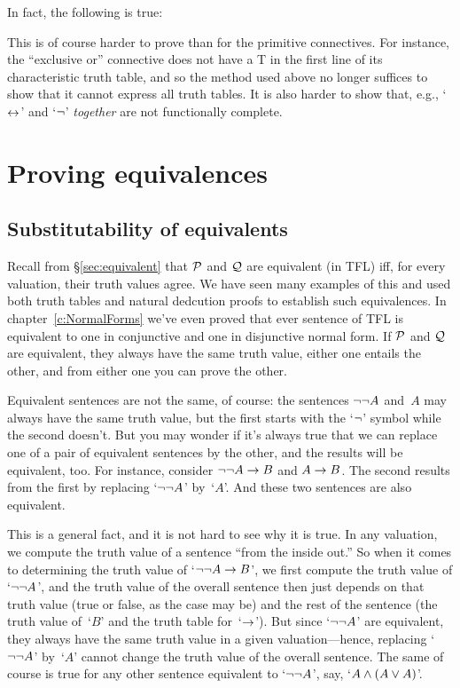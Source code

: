 In fact, the following is true:
        

This is of course harder to prove than for the primitive connectives. For instance, the ``exclusive or'' connective does not have a T in the first line of its characteristic truth table, and so the method used above no longer suffices to show that it cannot express all truth tables.  It is also harder to show that, e.g., `$\leftrightarrow$' and `$\neg$' \emph{together} are not functionally complete.

\chapter{Proving equivalences}\label{ch:equivalences}

\section{Substitutability of equivalents}

Recall from \S\ref{sec:equivalent} that $\mathcal{P}$ and $\mathcal{Q}$ are equivalent (in TFL) iff, for every valuation, their truth values agree.  We have seen many examples of this and used both truth tables and natural dedcution proofs to establish such equivalences.  In chapter~\ref{c:NormalForms} we've even proved that ever sentence of TFL is equivalent to one in conjunctive and one in disjunctive normal form.  If $\mathcal{P}$ and $\mathcal{Q}$ are equivalent, they always have the same truth value, either one entails the other, and from either one you can prove the other.

Equivalent sentences are not the same, of course: the sentences $\neg\neg A$ and~$A$ may always have the same truth value, but the first starts with the `$\neg$' symbol while the second doesn't.  But you may wonder if it's always true that we can replace one of a pair of equivalent sentences by the other, and the results will be equivalent, too.  For instance, consider $\neg\neg A \rightarrow B$ and $A \rightarrow B$.  The second results from the first by replacing `$\neg\neg A$' by~`$A$'.  And these two sentences are also equivalent.

This is a general fact, and it is not hard to see why it is true.  In any valuation, we compute the truth value of a sentence ``from the inside out.'' So when it comes to determining the truth value of `$\neg\neg A \rightarrow B$', we first compute the truth value of `$\neg\neg A$', and the truth value of the overall sentence then just depends on that truth value (true or false, as the case may be) and the rest of the sentence (the truth value of~`$B$' and the truth table for~`$\rightarrow$'). But since `$\neg\neg A$' are equivalent, they always have the same truth value in a given valuation---hence, replacing `$\neg\neg A$' by~`$A$' cannot change the truth value of the overall sentence.  The same of course is true for any other sentence equivalent to `$\neg\neg A$', say, `$A \wedge (A \vee A)$'.

